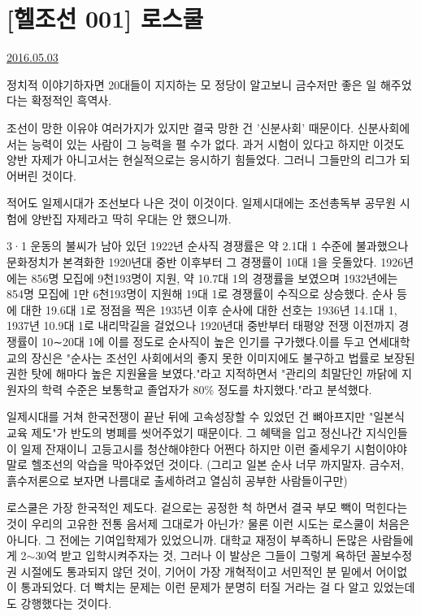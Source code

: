 

\section{[헬조선 001] 로스쿨}
\href{https://www.kockoc.com/Apoc/758436}{2016.05.03}

\vspace{5mm}

정치적 이야기하자면 20대들이 지지하는 모 정당이 알고보니 금수저만 좋은 일 해주었다는 확정적인 흑역사.
\vspace{5mm}

조선이 망한 이유야 여러가지가 있지만 결국 망한 건 '신분사회' 때문이다.
신분사회에서는 능력이 있는 사람이 그 능력을 펼 수가 없다.
과거 시험이 있다고 하지만 이것도 양반 자제가 아니고서는 현실적으로는 응시하기 힘들었다.
그러니 그들만의 리그가 되어버린 것이다.
\vspace{5mm}

적어도 일제시대가 조선보다 나은 것이 이것이다. 일제시대에는 조선총독부 공무원 시험에 양반집 자제라고 딱히 우대는 안 했으니까.
\vspace{5mm}

3·1 운동의 불씨가 남아 있던 1922년 순사직 경쟁률은 약 2.1대 1 수준에 불과했으나 문화정치가 본격화한 1920년대 중반 이후부터 그 경쟁률이 10대 1을 웃돌았다. 1926년에는 856명 모집에 9천193명이 지원, 약 10.7대 1의 경쟁률을 보였으며 1932년에는 854명 모집에 1만 6천193명이 지원해 19대 1로 경쟁률이 수직으로 상승했다. 순사 등에 대한 19.6대 1로 정점을 찍은 1935년 이후 순사에 대한 선호는 1936년 14.1대 1, 1937년 10.9대 1로 내리막길을 걸었으나 1920년대 중반부터 태평양 전쟁 이전까지 경쟁률이 10∼20대 1에 이를 정도로 순사직이 높은 인기를 구가했다.이를 두고 연세대학교의 장신은 "순사는 조선인 사회에서의 좋지 못한 이미지에도 불구하고 법률로 보장된 권한 탓에 해마다 높은 지원율을 보였다."라고 지적하면서 "관리의 최말단인 까닭에 지원자의 학력 수준은 보통학교 졸업자가 80$\%$ 정도를 차지했다."라고 분석했다.
\vspace{5mm}

일제시대를 거쳐 한국전쟁이 끝난 뒤에 고속성장할 수 있었던 건 뼈아프지만 "일본식 교육 제도"가 반도의 병폐를 씻어주었기 때문이다.
그 혜택을 입고 정신나간 지식인들이 일제 잔재이니 고등고시를 청산해야한다 어쩐다 하지만
이런 줄세우기 시험이야야말로 헬조선의 악습을 막아주었던 것이다.
(그리고 일본 순사 너무 까지말자. 금수저, 흙수저론으로 보자면 나름대로 출세하려고 열심히 공부한 사람들이구만)
\vspace{5mm}

로스쿨은 가장 한국적인 제도다. 겉으로는 공정한 척 하면서 결국 부모 빽이 먹힌다는 것이 우리의 고유한 전통 음서제 그대로가 아닌가?
물론 이런 시도는 로스쿨이 처음은 아니다. 그 전에는 기여입학제가 있었으니까.
대학교 재정이 부족하니 돈많은 사람들에게 2$\sim$30억 받고 입학시켜주자는 것,
그러나 이 발상은 그들이 그렇게 욕하던 꼴보수정권 시절에도 통과되지 않던 것이,
기어이 가장 개혁적이고 서민적인 분 밑에서 어이없이 통과되었다.
더 빡치는 문제는 이런 문제가 분명히 터질 거라는 걸 다 알고 있었는데도 강행했다는 것이다.
\vspace{5mm}

